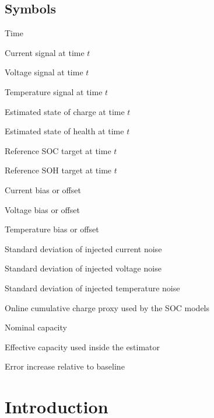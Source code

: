 \documentclass[review]{elsarticle}
\begin{document}
\subsection*{Symbols}
\begin{description}[style=multiline,leftmargin=1.7cm,font=\bfseries]
\item[$t$] Time
\item[$I(t)$] Current signal at time $t$
\item[$U(t)$] Voltage signal at time $t$
\item[$T(t)$] Temperature signal at time $t$
\item[$\widehat{\mathrm{SOC}}(t)$] Estimated state of charge at time $t$
\item[$\widehat{\mathrm{SOH}}(t)$] Estimated state of health at time $t$
\item[$\mathrm{SOC}_{\mathrm{ref}}(t)$] Reference SOC target at time $t$
\item[$\mathrm{SOH}_{\mathrm{ref}}(t)$] Reference SOH target at time $t$
\item[$\Delta I$] Current bias or offset
\item[$\Delta U$] Voltage bias or offset
\item[$\Delta T$] Temperature bias or offset
\item[$\sigma_I$] Standard deviation of injected current noise
\item[$\sigma_U$] Standard deviation of injected voltage noise
\item[$\sigma_T$] Standard deviation of injected temperature noise
\item[$Q_c$] Online cumulative charge proxy used by the SOC models
\item[$C_{\mathrm{nom}}$] Nominal capacity
\item[$C_{\mathrm{eff}}$] Effective capacity used inside the estimator
\item[$\Delta\mathrm{MAE}$] Error increase relative to baseline
\end{description}
\normalsize

\section{Introduction}
\end{document}
